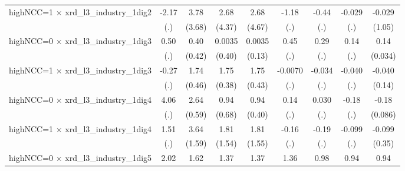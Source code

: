 {\begin{tabular}{l*{8}{c}}
\addlinespace
highNCC=1 $\times$ xrd\_l3\_industry\_1dig2&       -2.17         &        3.78         &        2.68         &        2.68         &       -1.18         &       -0.44         &      -0.029         &      -0.029         \\
                    &         (.)         &      (3.68)         &      (4.37)         &      (4.67)         &         (.)         &         (.)         &         (.)         &      (1.05)         \\
\addlinespace
highNCC=0 $\times$ xrd\_l3\_industry\_1dig3&        0.50         &        0.40         &      0.0035         &      0.0035         &        0.45         &        0.29         &        0.14         &        0.14\sym{***}\\
                    &         (.)         &      (0.42)         &      (0.40)         &      (0.13)         &         (.)         &         (.)         &         (.)         &     (0.034)         \\
\addlinespace
highNCC=1 $\times$ xrd\_l3\_industry\_1dig3&       -0.27         &        1.74\sym{***}&        1.75\sym{***}&        1.75\sym{***}&     -0.0070         &      -0.034         &      -0.040         &      -0.040         \\
                    &         (.)         &      (0.46)         &      (0.38)         &      (0.43)         &         (.)         &         (.)         &         (.)         &      (0.14)         \\
\addlinespace
highNCC=0 $\times$ xrd\_l3\_industry\_1dig4&        4.06         &        2.64\sym{***}&        0.94         &        0.94\sym{**} &        0.14         &       0.030         &       -0.18         &       -0.18\sym{**} \\
                    &         (.)         &      (0.59)         &      (0.68)         &      (0.40)         &         (.)         &         (.)         &         (.)         &     (0.086)         \\
\addlinespace
highNCC=1 $\times$ xrd\_l3\_industry\_1dig4&        1.51         &        3.64\sym{**} &        1.81         &        1.81         &       -0.16         &       -0.19         &      -0.099         &      -0.099         \\
                    &         (.)         &      (1.59)         &      (1.54)         &      (1.55)         &         (.)         &         (.)         &         (.)         &      (0.35)         \\
\addlinespace
highNCC=0 $\times$ xrd\_l3\_industry\_1dig5&        2.02         &        1.62\sym{***}&        1.37\sym{**} &        1.37         &        1.36         &        0.98         &        0.94         &        0.94\sym{***}\\

\end{tabular}}
